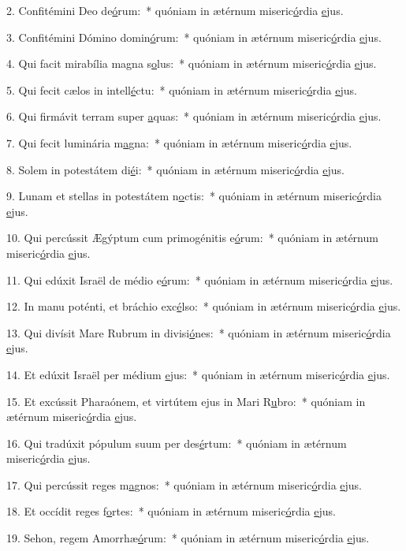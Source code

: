 2. Confitémini Deo de\uline{ó}rum:~* quóniam in ætérnum miseric\uline{ó}rdia \uline{e}jus.\par 
3. Confitémini Dómino domin\uline{ó}rum:~* quóniam in ætérnum miseric\uline{ó}rdia \uline{e}jus.\par 
4. Qui facit mirabília magna s\uline{o}lus:~* quóniam in ætérnum miseric\uline{ó}rdia \uline{e}jus.\par 
5. Qui fecit cælos in intell\uline{é}ctu:~* quóniam in ætérnum miseric\uline{ó}rdia \uline{e}jus.\par 
6. Qui firmávit terram super \uline{a}quas:~* quóniam in ætérnum miseric\uline{ó}rdia \uline{e}jus.\par 
7. Qui fecit luminária m\uline{a}gna:~* quóniam in ætérnum miseric\uline{ó}rdia \uline{e}jus.\par 
8. Solem in potestátem di\uline{é}i:~* quóniam in ætérnum miseric\uline{ó}rdia \uline{e}jus.\par 
9. Lunam et stellas in potestátem n\uline{o}ctis:~* quóniam in ætérnum miseric\uline{ó}rdia \uline{e}jus.\par 
10. Qui percússit Ægýptum cum primogénitis e\uline{ó}rum:~* quóniam in ætérnum miseric\uline{ó}rdia \uline{e}jus.\par 
11. Qui edúxit Israël de médio e\uline{ó}rum:~* quóniam in ætérnum miseric\uline{ó}rdia \uline{e}jus.\par 
12. In manu poténti, et bráchio exc\uline{é}lso:~* quóniam in ætérnum miseric\uline{ó}rdia \uline{e}jus.\par 
13. Qui divísit Mare Rubrum in divisi\uline{ó}nes:~* quóniam in ætérnum miseric\uline{ó}rdia \uline{e}jus.\par 
14. Et edúxit Israël per médium \uline{e}jus:~* quóniam in ætérnum miseric\uline{ó}rdia \uline{e}jus.\par 
15. Et excússit Pharaónem, et virtútem ejus in Mari R\uline{u}bro:~* quóniam in ætérnum miseric\uline{ó}rdia \uline{e}jus.\par 
16. Qui tradúxit pópulum suum per des\uline{é}rtum:~* quóniam in ætérnum miseric\uline{ó}rdia \uline{e}jus.\par 
17. Qui percússit reges m\uline{a}gnos:~* quóniam in ætérnum miseric\uline{ó}rdia \uline{e}jus.\par 
18. Et occídit reges f\uline{o}rtes:~* quóniam in ætérnum miseric\uline{ó}rdia \uline{e}jus.\par 
19. Sehon, regem Amorrhæ\uline{ó}rum:~* quóniam in ætérnum miseric\uline{ó}rdia \uline{e}jus.\par 
